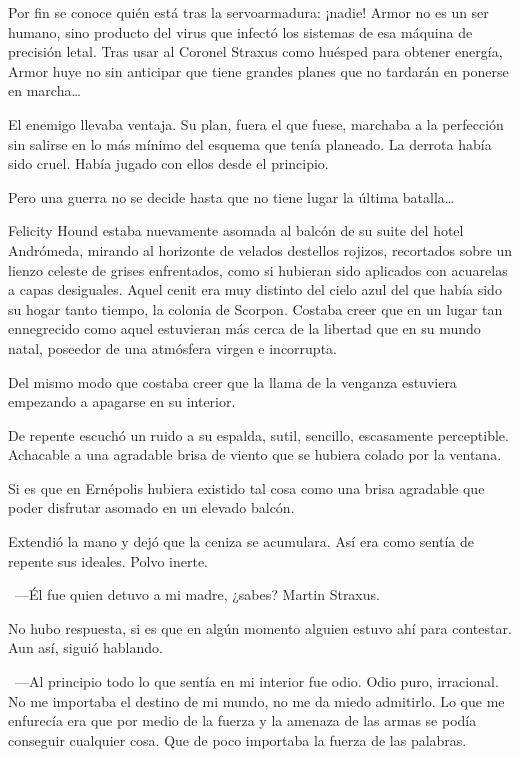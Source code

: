 \begin{prev}
    Por fin se conoce quién está tras la servoarmadura: ¡nadie! Armor no es un ser humano, sino producto del virus que infectó los sistemas de esa máquina de precisión letal. Tras usar al Coronel Straxus como huésped para obtener energía, Armor huye no sin anticipar que tiene grandes planes que no tardarán en ponerse en marcha\dots
\end{prev}

\noindent
El enemigo llevaba ventaja. Su plan, fuera el que fuese, marchaba a la perfección sin salirse en lo más mínimo del esquema que tenía planeado. La derrota había sido cruel. Había jugado con ellos desde el principio.

Pero una guerra no se decide hasta que no tiene lugar la última batalla\dots

\bigskip\noindent
Felicity Hound estaba nuevamente asomada al balcón de su suite del hotel Andrómeda, mirando al horizonte de velados destellos rojizos, recortados sobre un lienzo celeste de grises enfrentados, como si hubieran sido aplicados con acuarelas a capas desiguales. Aquel cenit era muy distinto del cielo azul del que había sido su hogar tanto tiempo, la colonia de Scorpon. Costaba creer que en un lugar tan ennegrecido como aquel estuvieran más cerca de la libertad que en su mundo natal, poseedor de una atmósfera virgen e incorrupta.

Del mismo modo que costaba creer que la llama de la venganza estuviera empezando a apagarse en su interior.

De repente escuchó un ruido a su espalda, sutil, sencillo, escasamente perceptible. Achacable a una agradable brisa de viento que se hubiera colado por la ventana.

Si es que en Ernépolis hubiera existido tal cosa como una brisa agradable que poder disfrutar asomado en un elevado balcón.

Extendió la mano y dejó que la ceniza se acumulara. Así era como sentía de repente sus ideales. Polvo inerte.

~---Él fue quien detuvo a mi madre, ¿sabes? Martin Straxus.

No hubo respuesta, si es que en algún momento alguien estuvo ahí para contestar. Aun así, siguió hablando.

~---Al principio todo lo que sentía en mi interior fue odio. Odio puro, irracional. No me importaba el destino de mi mundo, no me da miedo admitirlo. Lo que me enfurecía era que por medio de la fuerza y la amenaza de las armas se podía conseguir cualquier cosa. Que de poco importaba la fuerza de las palabras.

